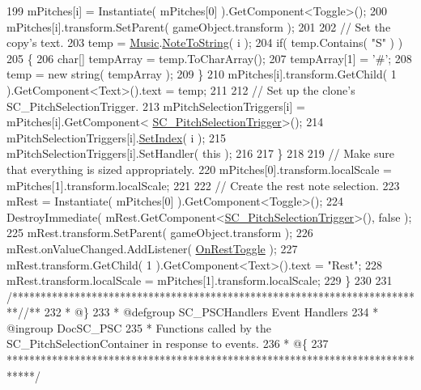 \begin{DoxyCodeInclude}
199             mPitches[i] = Instantiate( mPitches[0] ).GetComponent<Toggle>();
200             mPitches[i].transform.SetParent( gameObject.transform );
201 
202             \textcolor{comment}{// Set the copy's text.}
203             temp = \hyperlink{class_music}{Music}.\hyperlink{group___music_stat_func_ga85a22c905d56d4c5f4e62159bfecee8c}{NoteToString}( i );
204             \textcolor{keywordflow}{if}( temp.Contains( \textcolor{stringliteral}{"S"} ) )
205             \{
206                 \textcolor{keywordtype}{char}[] tempArray = temp.ToCharArray();
207                 tempArray[1] = \textcolor{charliteral}{'#'};
208                 temp = \textcolor{keyword}{new} string( tempArray );
209             \}
210             mPitches[i].transform.GetChild( 1 ).GetComponent<Text>().text = temp;
211 
212             \textcolor{comment}{// Set up the clone's SC\_PitchSelectionTrigger.}
213             mPitchSelectionTriggers[i] = mPitches[i].GetComponent<
      \hyperlink{class_s_c___pitch_selection_trigger}{SC\_PitchSelectionTrigger}>();
214             mPitchSelectionTriggers[i].\hyperlink{group___s_c___p_s_t_pub_func_ga0b4edbf9719a384aa5cf8d29d1065696}{SetIndex}( i );
215             mPitchSelectionTriggers[i].SetHandler( \textcolor{keyword}{this} );
216 
217         \}
218 
219         \textcolor{comment}{// Make sure that everything is sized appropriately.}
220         mPitches[0].transform.localScale = mPitches[1].transform.localScale;
221 
222         \textcolor{comment}{// Create the rest note selection.}
223         mRest = Instantiate( mPitches[0] ).GetComponent<Toggle>();
224         DestroyImmediate( mRest.GetComponent<\hyperlink{class_s_c___pitch_selection_trigger}{SC\_PitchSelectionTrigger}>(), \textcolor{keyword}{false} );
225         mRest.transform.SetParent( gameObject.transform );
226         mRest.onValueChanged.AddListener( \hyperlink{group___s_c___p_s_c_handlers_ga8715b5976fdae2c56e05a60832553864}{OnRestToggle} );
227         mRest.transform.GetChild( 1 ).GetComponent<Text>().text = \textcolor{stringliteral}{"Rest"};
228         mRest.transform.localScale = mPitches[1].transform.localScale;
229     \}
230 
231     \textcolor{comment}{/*************************************************************************/}\textcolor{comment}{/** }
232 \textcolor{comment}{     * @\}}
233 \textcolor{comment}{     * @defgroup SC\_PSCHandlers Event Handlers}
234 \textcolor{comment}{     * @ingroup DocSC\_PSC}
235 \textcolor{comment}{     * Functions called by the SC\_PitchSelectionContainer in response to events.}
236 \textcolor{comment}{     * @\{}
237 \textcolor{comment}{    *****************************************************************************/}

\end{DoxyCodeInclude}
